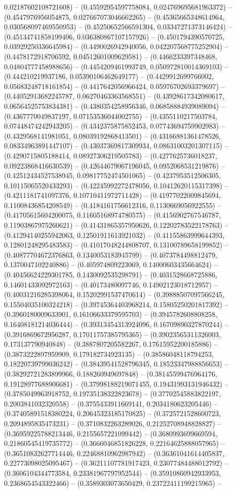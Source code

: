 0.02187602108721608) -- (0.45592954597758084, 0.024769695681963372) -- (0.4547976956054875, 0.027667073046662265) -- (0.45365665348614964, 0.030568097469550953) -- (0.45250652566591304, 0.03347271373146424) -- (0.45134741858199406, 0.036380867107157926) -- (0.4501794390570725, 0.03929250336645984) -- (0.4490026942940056, 0.042207568775252904) -- (0.4478172918706592, 0.04512601009629581) -- (0.4466233397348468, 0.04804777458988656) -- (0.4454209461993749, 0.050972810014369103) -- (0.444210219937186, 0.05390106462649177) -- (0.4429912699766002, 0.05683248718161854) -- (0.4417642056966424, 0.05976702693379697) -- (0.44052913682245787, 0.06270463363568551) -- (0.43928617342080617, 0.06564525753834381) -- (0.4380354258956346, 0.06858884939089094) -- (0.4367770049837197, 0.07153536044002755) -- (0.4355110217503784, 0.07448474242943205) -- (0.4342375875852453, 0.07743694759902983) -- (0.4329568141981051, 0.08039192868413501) -- (0.43166881361478526, 0.08334963891447107) -- (0.43037369817309934, 0.08631003201307115) -- (0.4290715805188414, 0.08927306219505783) -- (0.4277625736018237, 0.09223868416630539) -- (0.42644679067196045, 0.0952068531219876) -- (0.42512434527538945, 0.09817752474501065) -- (0.4237953512506305, 0.10115065520433293) -- (0.42245992272478056, 0.10412620115317398) -- (0.4211181741097376, 0.10710411972711428) -- (0.41977022009845694, 0.11008436854208549) -- (0.4184161756612316, 0.1130669056922555) -- (0.41705615604200075, 0.11605168974780575) -- (0.4156902767546787, 0.11903867975260621) -- (0.41431865357950626, 0.12202783522178763) -- (0.41294140255942063, 0.12501911613921032) -- (0.41155863999644393, 0.12801248295483583) -- (0.41017048244808707, 0.13100789658199852) -- (0.40877704672376863, 0.1340053183945799) -- (0.4073784498812479, 0.1370047102240886) -- (0.405974809223069, 0.14000603435664624) -- (0.40456624229301785, 0.1430092535298791) -- (0.4031528668725886, 0.14601433092972163) -- (0.40173480097746, 0.14902123018712957) -- (0.40031216285398064, 0.15202991537470614) -- (0.39888507097566245, 0.15504035100324218) -- (0.39745364403968214, 0.15805250201817392) -- (0.3960180009633901, 0.16106633379595703) -- (0.3945782608808258, 0.16408181214036444) -- (0.39313454313924096, 0.16709890327870244) -- (0.3916869672956287, 0.17011757385795365) -- (0.39023565311326003, 0.173137790940848) -- (0.3887807205582267, 0.17615952200185886) -- (0.3873222897959909, 0.179182734923135) -- (0.38586048118794253, 0.18220739799036242) -- (0.38439541528796345, 0.18523347988856653) -- (0.38292721283899966, 0.188260949697848) -- (0.38145599476964176, 0.19128977688906681) -- (0.37998188219071455, 0.19431993131946432) -- (0.3785049963918752, 0.19735138322823678) -- (0.37702545883822197, 0.2003841032320558) -- (0.3755433911669141, 0.2034180623205446) -- (0.37405891518380224, 0.20645323185170825) -- (0.3725721528600723, 0.2094895835473231) -- (0.3710832263289026, 0.21252708948828827) -- (0.36959225788213446, 0.2155657221099442) -- (0.3680993699669594, 0.21860545419735772) -- (0.3666046851826228, 0.22164625888057965) -- (0.36510832627714446, 0.22468810962987942) -- (0.36361041614405837, 0.22773098025095467) -- (0.36211107781917423, 0.23077484488012792) -- (0.3606104344773584, 0.23381967797952544) -- (0.35910860942933953, 0.2368654543322466) -- (0.3589303073650429, 0.23722411199215965) -- 